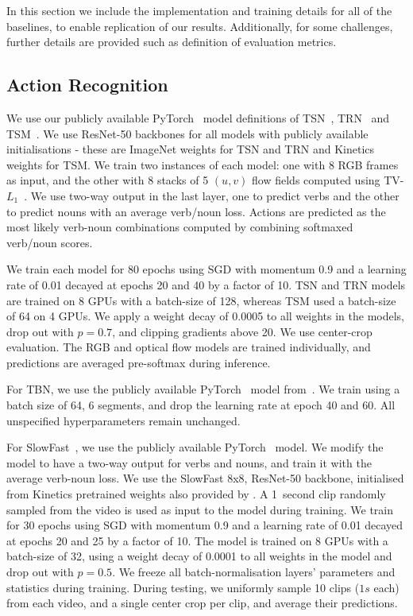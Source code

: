 \documentclass[twocolumn]{svjour3}          \smartqed
\newcommand{\chParagraph}[1]{\noindent {\textbf{#1.}} \hspace{6pt}}
\begin{document}
In this section we include the implementation and training details for all of the baselines, to enable replication of our results. Additionally, for some challenges, further details are provided such as definition of evaluation metrics.

\subsection{Action Recognition}
\label{subsec:challenge_action_recog_supp}

\chParagraph{Implementation and Training Details} 
We use our publicly available PyTorch~\cite{pytorch} model definitions of TSN~\cite{wang2016tsn}, TRN~\cite{zhou2017trn} and TSM~\cite{lin2019tsm}. 
We use ResNet-50 backbones for all models with publicly available initialisations - these are ImageNet weights for TSN and TRN and Kinetics weights for TSM.
We train two instances of each model: one with 8 RGB frames as input, and the other with 8 stacks of 5 $(u, v)$ flow fields computed using TV-$L_1$~\cite{zach2007duality}.
We use two-way output in the last layer, one to predict verbs and the other to predict nouns with an average verb/noun loss.
Actions are predicted as the most likely verb-noun combinations computed by combining softmaxed verb/noun scores.

We train each model for 80 epochs using SGD with momentum 0.9 and a learning rate of 0.01 decayed at epochs 20 and 40 by a factor of 10.
TSN and TRN models are trained on 8 GPUs with a batch-size of 128, whereas TSM used a batch-size of 64 on 4 GPUs.
We apply a weight decay of 0.0005 to all weights in the models, drop out with $p=0.7$, and clipping gradients above 20.
We use center-crop evaluation.
The RGB and optical flow models are trained individually, and predictions are averaged pre-softmax during inference.


For TBN, we use the publicly available PyTorch~\cite{pytorch} model from~\cite{kazakos2019epic}. We train using a batch size of 64, 6 segments, and drop the learning rate at epoch 40 and 60. All unspecified hyperparameters remain unchanged. 

For SlowFast~\cite{feichtenhofer2019slowfast}, we use the publicly available PyTorch~\cite{pytorch} model. We modify the model to have a two-way output for verbs and nouns, and train it with the average verb-noun loss. We use the SlowFast 8x8, ResNet-50 backbone, initialised from Kinetics pretrained weights also provided by \cite{feichtenhofer2019slowfast}. A 1~second clip randomly sampled from the video is used as input to the model during training. We train for 30 epochs using SGD with momentum 0.9 and a learning rate of 0.01 decayed at epochs 20 and 25 by a factor of 10. 
The model is trained on 8 GPUs with a batch-size of 32, using a weight decay of 0.0001 to all weights in the model and drop out with $p=0.5$. We freeze all batch-normalisation layers' parameters and statistics during training. During testing, we uniformly sample 10 clips ($1s$ each) from each video, and a single center crop per clip, and average their predictions. 
\end{document}
